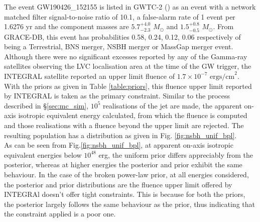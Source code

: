     The event GW190426\_152155 is listed in GWTC-2 (\cite{abbott_2020}) as an event with
    a network matched filter signal-to-noise ratio of 10.1, a false-alarm rate of 1
    event per 1.6276 yr and the component masses are $5.7^{+4.0}_{-2.3}$ $M_{\odot}$ and
    $1.5^{+0.8}_{-0.5}$ $M_{\odot}$. From GRACE-DB, this event has probabilities 0.58,
    0.24, 0.12, 0.06 respectively of being a Terrestrial, BNS merger, NSBH merger or
    MassGap merger event.\\ Although there were no significant excesses reported by any
    of the Gamma-ray satellites observing the LVC localisation area at the time of the
    GW trigger, the INTEGRAL satellite reported an upper limit fluence of $1.7 \times
    10^{-7} \text{ ergs/cm}^2$. With the priors as given in Table \ref{table:priors},
    this fluence upper limit reported by INTEGRAL is taken as the primary constraint.
    Similar to the process described in \S\ref{sec:mc_sim}, $10^5$ realisations of the
    jet are made, the apparent on-axis isotropic equivalent energy calculated, from
    which the fluence is computed and those realisations with a fluence beyond the upper
    limit are rejected. The resulting population has a distribution as given in Fig.
    \ref{fig:nsbh_unif_bpl}.\\
    As can be seen from Fig.\ref{fig:nsbh_unif_bpl}, at apparent on-axis isotropic
    equivalent energies below $10^{48}$ erg, the uniform prior differs appreciably from
    the posterior, whereas at higher energies the posterior and prior exhibit the same
    behaviour. In the case of the broken power-law prior, at all energies considered,
    the posterior and prior distributions are  the fluence upper limit offered by
    INTEGRAl doesn't offer tight constraints. This is because for both the priors, the
    posterior largely follows the same behaviour as the prior, thus indicating that the
    constraint applied is a poor one.

